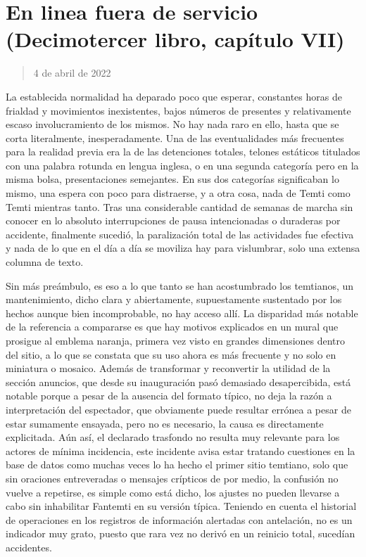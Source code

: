 \documentclass[
]{book}
\begin{document}
\hypertarget{en-linea-fuera-de-servicio-decimotercer-libro-capuxedtulo-vii}{%
\section{En linea fuera de servicio (Decimotercer libro, capítulo VII)}\label{en-linea-fuera-de-servicio-decimotercer-libro-capuxedtulo-vii}}

\begin{quote}
4 de abril de 2022
\end{quote}

La establecida normalidad ha deparado poco que esperar, constantes horas de frialdad y movimientos inexistentes, bajos números de presentes y relativamente escaso involucramiento de los mismos. No hay nada raro en ello, hasta que se corta literalmente, inesperadamente. Una de las eventualidades más frecuentes para la realidad previa era la de las detenciones totales, telones estáticos titulados con una palabra rotunda en lengua inglesa, o en una segunda categoría pero en la misma bolsa, presentaciones semejantes. En sus dos categorías significaban lo mismo, una espera con poco para distraerse, y a otra cosa, nada de Temti como Temti mientras tanto. Tras una considerable cantidad de semanas de marcha sin conocer en lo absoluto interrupciones de pausa intencionadas o duraderas por accidente, finalmente sucedió, la paralización total de las actividades fue efectiva y nada de lo que en el día a día se moviliza hay para vislumbrar, solo una extensa columna de texto.

Sin más preámbulo, es eso a lo que tanto se han acostumbrado los temtianos, un mantenimiento, dicho clara y abiertamente, supuestamente sustentado por los hechos aunque bien incomprobable, no hay acceso allí. La disparidad más notable de la referencia a compararse es que hay motivos explicados en un mural que prosigue al emblema naranja, primera vez visto en grandes dimensiones dentro del sitio, a lo que se constata que su uso ahora es más frecuente y no solo en miniatura o mosaico. Además de transformar y reconvertir la utilidad de la sección anuncios, que desde su inauguración pasó demasiado desapercibida, está notable porque a pesar de la ausencia del formato típico, no deja la razón a interpretación del espectador, que obviamente puede resultar errónea a pesar de estar sumamente ensayada, pero no es necesario, la causa es directamente explicitada. Aún así, el declarado trasfondo no resulta muy relevante para los actores de mínima incidencia, este incidente avisa estar tratando cuestiones en la base de datos como muchas veces lo ha hecho el primer sitio temtiano, solo que sin oraciones entreveradas o mensajes crípticos de por medio, la confusión no vuelve a repetirse, es simple como está dicho, los ajustes no pueden llevarse a cabo sin inhabilitar Fantemti en su versión típica. Teniendo en cuenta el historial de operaciones en los registros de información alertadas con antelación, no es un indicador muy grato, puesto que rara vez no derivó en un reinicio total, sucedían accidentes.
\end{document}
